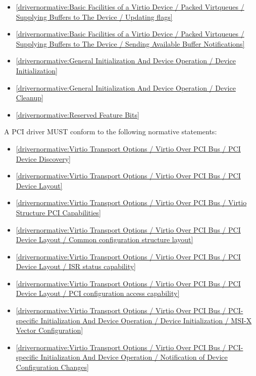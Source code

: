 \begin{itemize}
\item \ref{drivernormative:Basic Facilities of a Virtio Device / Packed Virtqueues / Supplying Buffers to The Device / Updating flags}
\item \ref{drivernormative:Basic Facilities of a Virtio Device / Packed Virtqueues / Supplying Buffers to The Device / Sending Available Buffer Notifications}
\item \ref{drivernormative:General Initialization And Device Operation / Device Initialization}
\item \ref{drivernormative:General Initialization And Device Operation / Device Cleanup}
\item \ref{drivernormative:Reserved Feature Bits}
\end{itemize}

\label{sec:Conformance / Driver Conformance / PCI Driver Conformance}

A PCI driver MUST conform to the following normative statements:

\begin{itemize}
\item \ref{drivernormative:Virtio Transport Options / Virtio Over PCI Bus / PCI Device Discovery}
\item \ref{drivernormative:Virtio Transport Options / Virtio Over PCI Bus / PCI Device Layout}
\item \ref{drivernormative:Virtio Transport Options / Virtio Over PCI Bus / Virtio Structure PCI Capabilities}
\item \ref{drivernormative:Virtio Transport Options / Virtio Over PCI Bus / PCI Device Layout / Common configuration structure layout}
\item \ref{drivernormative:Virtio Transport Options / Virtio Over PCI Bus / PCI Device Layout / ISR status capability}
\item \ref{drivernormative:Virtio Transport Options / Virtio Over PCI Bus / PCI Device Layout / PCI configuration access capability}
\item \ref{drivernormative:Virtio Transport Options / Virtio Over PCI Bus / PCI-specific Initialization And Device Operation / Device Initialization / MSI-X Vector Configuration}
\item \ref{drivernormative:Virtio Transport Options / Virtio Over PCI Bus / PCI-specific Initialization And Device Operation / Notification of Device Configuration Changes}
\end{itemize}

